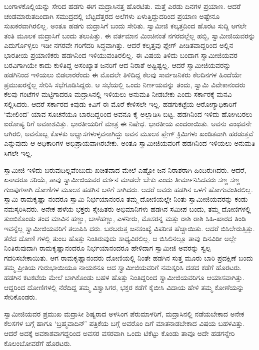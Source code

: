 ಬಂಗಾಳಕೊಲ್ಲಿಯನ್ನು ಸೇರಿದ ಹಡಗು ಈಗ ಮದ್ರಾಸಿನತ್ತ ಹೊರಟಿತು. ಮತ್ತೆ ಎರಡು ದಿನಗಳ ಪ್ರಯಾಣ. ಆದರೆ ಚಂಡಮಾರುತದಿಂದಾಗಿ ಸಮುದ್ರದಲ್ಲಿ ಬೆಟ್ಟದೆತ್ತರದ ಅಲೆಗಳು ಏಳುತ್ತಿದ್ದುದರಿಂದ ಪ್ರಯಾಣ ಅಷ್ಟೇನೂ ಸುಖಕರವಾಗಿರಲಿಲ್ಲ. ಅಂತೂ ಹಡಗು ಮದ್ರಾಸಿಗೆ ಬಂದು ಸೇರಿತು. ಸ್ವಾಮೀಜಿ ಕಲ್ಕತ್ತದಿಂದ ಹೊರಟ ಸುದ್ದಿ ಆಗಲೇ ತಂತಿ ಮೂಲಕ ಮದ್ರಾಸಿಗೆ ಬಂದು ತಲುಪಿತ್ತು. ಈ ವರ್ತಮಾನ ಮಿಂಚಿನಂತೆ ನಗರದಲ್ಲೆಲ್ಲ ಹಬ್ಬಿ, ಸ್ವಾಮೀಜಿಯವರನ್ನು ಎದುರ್ಗೊಳ್ಳಲು ಇಡೀ ನಗರವೇ ಗರಿಗೆದರಿ ಸಿದ್ಧವಾಗಿತ್ತು. ಆದರೆ ಕಲ್ಕತ್ತವು ಪ್ಲೇಗ್ ಪೀಡಿತವಾದ್ದರಿಂದ ಅಲ್ಲಿನ ಭಾರತೀಯ ಪ್ರಯಾಣಿಕರು ಹಡಗಿನಿಂದ ಇಳಿಯುವಂತಿರಲಿಲ್ಲ. ಈ ವಿಷಯ ತಿಳಿದು ಬಂದಾಗ ಸ್ವಾಮೀಜಿಯವರ ಬರವಿಗಾಗಿಯೇ ಕಾದು ಕುಳಿತಿದ್ದ ಅಸಂಖ್ಯಾತ ಜನರಿಗೆ ಆದ ನಿರಾಶೆ ಅಷ್ಟಿಷ್ಟಲ್ಲ. ಆದರೆ ಸ್ವಾಮೀಜಿಯವರನ್ನು ಹಡಗಿನಿಂದ ಇಳಿಯಲು ಬಿಡಲಾರರೆಂದು ಈ ಮೊದಲೇ ತಿಳಿದಿದ್ದ ಕೆಲವು ಸಾರ್ವಜನಿಕರು ಕೆಲದಿನಗಳ ಹಿಂದೆಯೇ ಪ್ರಮುಖರನ್ನೆಲ್ಲ ಸೇರಿಸಿ ಸಭೆಗೂಡಿಸಿದ್ದರು. ಆ ಸಭೆಯಲ್ಲಿ ಒಂದು ನಿರ್ಣಯವನ್ನು ತಂದು, ಸ್ವಾಮಿ ವಿವೇಕಾನಂದರು ಕೆಲವು ಗಂಟೆಗಳ ಮಟ್ಟಿಗಾದರೂ ಮದ್ರಾಸಿನಲ್ಲಿ ಇಳಿಯಲು ಅನುಮತಿ ನೀಡಬೇಕು ಎಂದು ಸರ್ಕಾರಕ್ಕೆ ಮನವಿ ಸಲ್ಲಿಸಿದರು. ಆದರೆ ಸರ್ಕಾರದ ಕಿವುಡು ಕಿವಿಗೆ ಈ ಮೊರೆ ಕೇಳಿಸಲೇ ಇಲ್ಲ. ಹಡಗುಕಟ್ಟೆಯ ಆರೋಗ್ಯಾಧಿಕಾರಿಗೆ ‘ಮೇಲಿಂದ’ ಯಾವ ಸೂಚನೆಯೂ ಬಾರದಿದ್ದರಿಂದ ಅವನೂ ಕೈ ಅಲ್ಲಾಡಿಸಿ ಬಿಟ್ಟ. ಹಡಗಿನಿಂದ ಇಳಿದು ಹೋಗಿಬರಲು ಐರೋಪ್ಯ ರಿಗೆ ಅವಕಾಶವಿತ್ತು. ಭಾರತೀಯರಿಗೆ ಮಾತ್ರ ಈ ನಿಷೇಧ. ಭಾರತೀಯ ಎಂದರಾಯಿತು. ಅವನು ಎಂಥವನೇ ಆಗಿರಲಿ, ಅವನೊಬ್ಬ ಕೊಳಕು ಅಭ್ಯಾಸಗಳುಳ್ಳವನಾಗಿದ್ದು ಅವನ ಮೂಲಕ ಪ್ಲೇಗ್ ಕ್ರಿಮಿಗಳು ಖಂಡಿತವಾಗಿ ಹರಡುತ್ತವೆ ಎನ್ನುವುದು ಆ ಅಧಿಕಾರಿಗಳ ಅಭಿಪ್ರಾಯವಾಗಿರಬೇಕು. ಅಂತೂ ಸ್ವಾಮೀಜಿಯವರಿಗೆ ಹಡಗಿನಿಂದ ಇಳಿಯಲು ಅನುಮತಿ ಸಿಗಲೇ ಇಲ್ಲ.

ಸ್ವಾಮೀಜಿ ಇಳಿದು ಬರುವುದಿಲ್ಲವೆಂಬುದು ಖಚಿತವಾದ ಮೇಲೆ ಎಷ್ಟೋ ಜನ ನಿರಾಶರಾಗಿ ಹಿಂದಿರುಗಿದರು. ಆದರೆ, ಏನಾದರೂ ಸರಿಯೆ, ತಾವು ಸ್ವಾಮೀಜಿಯವರ ದರ್ಶನ ಮಾಡಲೇ ಬೇಕು ಎಂದು ತೀರ್ಮಾನಿಸಿದವರು ಸಣ್ಣ ಸಣ್ಣ ಗುಂಪುಗಳಾಗಿ ದೋಣಿಗಳ ಮೂಲಕ ಹಡಗಿನ ಬಳಿಗೆ ಸಾಗಿದರು. ಆದರೆ ಅವರು ಹಡಗಿನ ಒಳಗೆ ಹೋಗುವಂತಿರಲಿಲ್ಲ. ಸ್ವಾಮಿ ರಾಮಕೃಷ್ಣಾ ನಂದರೂ ಸ್ವಾಮಿ ನಿರ್ಭಯಾನಂರೂ ತಮ್ಮ ದೋಣಿಯಲ್ಲೇ ನಿಂತು ಸ್ವಾಮೀಜಿಯವರನ್ನು ಕಂಡು ನಮಸ್ಕರಿಸಿದರು. ಅನೇಕ ಹಳೆಯ ಭಕ್ತರು ಸ್ನೇಹಿತರು ಅಭಿಮಾನಿಗಳು ಹಡಗಿನ ಸಮೀಪ ಬಂದು, ತಮ್ಮ ದೋಣಿಗಳಲ್ಲಿ ತುಂಬಿಕೊಂಡು ತಂದ ಮಾವಿನ ಹಣ್ಣು, ಬಾಳೆಹಣ್ಣು, ಎಳನೀರು, ಮೊಸರನ್ನ ಮತ್ತು ರಾಶಿ ರಾಶಿ ಸಿಹಿ-ಖಾರದ ತಿಂಡಿ ಇವನ್ನೆಲ್ಲ ಸ್ವಾಮೀಜಿಯವರಿಗೆ ತಲುಪಿಸಿ ದರು. ಬರಬರುತ್ತ ಜನಸಂಖ್ಯೆ ವಿಪರೀತ ಹೆಚ್ಚಾಯಿತು. ಆದರೆ ಬಿಸಿಲೇರುತ್ತಿತ್ತು. ತೆರೆದ ದೋಣಿ ಗಳಲ್ಲಿ ತುಂಬ ಹೊತ್ತು ನಿಂತಿರುವುದು ಸಾಧ್ಯವಿರಲಿಲ್ಲ. ಆ ಬಿಸಿಲಿನಲ್ಲೂ ತಾವು ದಿನವಿಡೀ ಅಲ್ಲೇ ನಿಂತಿರುವುದಾಗಿ ರಾಮಕೃಷ್ಣಾನಂದರೂ ನಿರ್ಭಯಾನಂದರೂ ಹೇಳಿದಾಗ ಸ್ವಾಮೀಜಿ ಅವರನ್ನು ಸ್ವಲ್ಪ ಗದರಿಸಬೇಕಾಯಿತು. ಆಗ ರಾಮಕೃಷ್ಣಾನಂದರು ದೋಣಿಯಲ್ಲಿ ನಿಂತೇ ಹಡಗಿನ ಸುತ್ತ ಮೂರು ಬಾರಿ ಪ್ರದಕ್ಷಿಣೆ ಬಂದು ತಮ್ಮ ಪ್ರೀತಿಯ ಗುರುಭಾಯಿಯೂ ನಾಯಕನೂ ಆದ ಸ್ವಾಮೀಜಿಯವರಿಗೆ ನಮಸ್ಕರಿಸಿ ದಡದ ಕಡೆಗೆ ಹೊರಟರು. ಹಡಗಿನ ಕಟಕಟೆಯ ಮೇಲೆ ಬಾಗಿಕೊಂಡು ಬಹಳ ಹೊತ್ತು ನಿಂತಿದ್ದರಿಂದ ಸ್ವಾಮೀಜಿಯವರಿಗೂ ಆಯಾಸವಾಗಿತ್ತು. ಆದ್ದರಿಂದ ದೋಣಿಗಳಲ್ಲಿ ನೆರೆದಿದ್ದ ತಮ್ಮ ವಿಶ್ವಾಸಿಗರ, ಭಕ್ತರ ಕಡೆಗೆ ಕೈಬೀಸಿ ವಿದಾಯ ಹೇಳಿ ತಮ್ಮ ಕೋಣೆಯನ್ನು ಸೇರಿಕೊಂಡರು.

ಸ್ವಾಮೀಜಿಯವರ ಪ್ರಮುಖ ಮದ್ರಾಸೀ ಶಿಷ್ಯರಾದ ಅಳಸಿಂಗ ಪೆರುಮಾಳರಿಗೆ, ಮದ್ರಾಸಿನಲ್ಲಿ ನಡೆಯಬೇಕಾದ ಅನೇಕ ಕೆಲಸಗಳ ಬಗ್ಗೆ ಹಾಗೂ ‘ಬ್ರಹ್ಮವಾದಿನ್​’ ಪತ್ರಿಕೆಯ ಬಗ್ಗೆ ಅವರೊಂ ದಿಗೆ ಮಾತನಾಡಬೇಕಾದ ವಿಷಯ ಬಹಳವಿತ್ತು. ಆದರೆ ಅದಕ್ಕೆ ಅವಕಾಶವಾಗದ್ದರಿಂದ ಅವಸರ ವಸರವಾಗಿ ಒಂದು ಟಿಕೆಟ್ಟು ಕೊಂಡು ತಾವೂ ಅದೇ ಹಡಗನ್ನೇರಿ ಕೊಲಂಬೋವರೆಗೆ ಹೊರಟರು.

